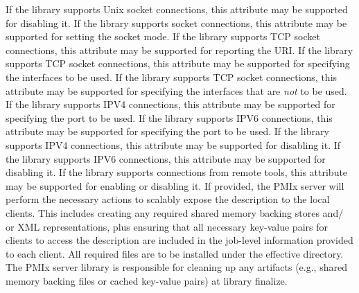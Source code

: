  If the library supports Unix socket connections, this attribute may be supported for disabling it.
\pasteAttributeItemEnd{}
 If the library supports socket connections, this attribute may be supported for setting the socket mode.
\pasteAttributeItemEnd{}
 If the library supports TCP socket connections, this attribute may be supported for reporting the URI.
\pasteAttributeItemEnd{}
 If the library supports TCP socket connections, this attribute may be supported for specifying the interfaces to be used.
\pasteAttributeItemEnd{}
 If the library supports TCP socket connections, this attribute may be supported for specifying the interfaces that are \textit{not} to be used.
\pasteAttributeItemEnd{}
 If the library supports IPV4 connections, this attribute may be supported for specifying the port to be used.
\pasteAttributeItemEnd{}
 If the library supports IPV6 connections, this attribute may be supported for specifying the port to be used.
\pasteAttributeItemEnd{}
 If the library supports IPV4 connections, this attribute may be supported for disabling it.
\pasteAttributeItemEnd{}
 If the library supports IPV6 connections, this attribute may be supported for disabling it.
\pasteAttributeItemEnd{}
 If the library supports connections from remote tools, this attribute may be supported for enabling or disabling it.
\pasteAttributeItemEnd{}
If provided, the \ac{PMIx} server will
perform the necessary actions to scalably expose the description to the local
clients. This includes creating any required shared memory backing stores and/
or \ac{XML} representations, plus ensuring that all necessary key-value pairs
for clients to access the description are included in the job-level
information provided to each client. All required files are to be installed
under the effective  directory. The \ac{PMIx}
server library is responsible for cleaning up any artifacts (e.g., shared
memory backing files or cached key-value pairs) at library finalize.
\pasteAttributeItemEnd{}

